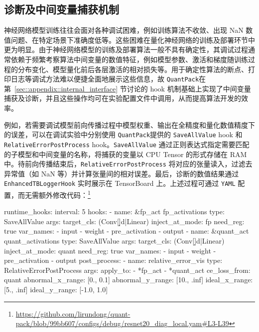 \documentclass[
]{shtthesis}
\providecommand{\QP}{\texttt{QuantPack}}
\begin{document}
\subsection{诊断及中间变量捕获机制}
神经网络模型训练往往会面对各种调试困难，例如训练算法不收敛、出现 NaN 数值问题、在特定场景下准确度低等。这些困难在量化神经网络的训练及部署环节中更为明显。由于神经网络模型的训练及部署算法一般不具有确定性，其调试过程通常依赖于频繁考察算法中间变量的数值特征，例如模型参数、激活和梯度随训练过程的分布变化、模型量化前后各层激活的相对损失等。用于确定性算法的断点、打印日志等调试方法难以便捷全面地展示这些信息，故 \QP 在第~\ref{sec::appendix::internal_interface} 节讨论的 hook 机制基础上实现了中间变量捕获及诊断，并且这些操作均可在实验配置文件中调用，从而提高算法开发的效率。

例如，若需要调试模型前向传播过程中模型权重、输出在全精度和量化数值精度下的误差，可以在调试实验中分别使用 \QP 提供的 \verb|SaveAllValue| hook 和 \verb|RelativeErrorPostProcess| hook。\verb|SaveAllValue| 通过正则表达式指定需要匹配的子模型和中间变量的名称，将捕获的变量以 CPU Tensor 的形式存储在 RAM 中。待前向传播结束后，\verb|RelativeErrorPostProcess| 将对应的张量读入，过滤去异常值（如 NaN 等）并计算张量间的相对误差。最后，诊断的数值结果通过 \verb|EnhancedTBLoggerHook| 实时展示在 TensorBoard 上。上述过程可通过 \verb|YAML| 配置，而无需额外修改代码：\footnote{\url{https://github.com/lirundong/quant-pack/blob/99bb607/configs/debug/resnet20_diag_local.yam\#L3-L39}}
\begin{yaml}
runtime_hooks:
  interval: 5
  hooks:
    - name: &fp_act fp_activations
      type: SaveAllValue
      args:
        target_cls: (Conv[\d]d|Linear)
        inject_at_mode: fp
        need_reg: true
        var_names:
          - input
          - weight
          - pre_activation
          - output
    - name: &quant_act quant_activations
      type: SaveAllValue
      args:
        target_cls: (Conv[\d]d|Linear)
        inject_at_mode: quant
        need_reg: true
        var_names:
          - input
          - weight
          - pre_activation
          - output
  post_process:
    - name: relative_error_vis
      type: RelativeErrorPostProcess
      args:
        apply_to:
          - *fp_act
          - *quant_act
        ce_loss_from: quant
        abnormal_x_range: [0., 0.1]
        abnormal_y_range: [10., .inf]
        ideal_x_range: [5., .inf]
        ideal_y_range: [-1.0, 1.0]
\end{yaml}
\end{document}
